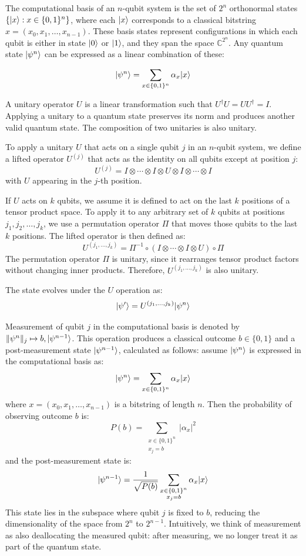 The computational basis of an $n$-qubit system is the set of $2^n$ orthonormal states $\{|x\rangle : x \in \{0,1\}^n\}$, where each $|x\rangle$ corresponds to a classical bitstring $x = (x_0, x_1, \ldots, x_{n-1})$. These basis states represent configurations in which each qubit is either in state $|0\rangle$ or $|1\rangle$, and they span the space $\mathbb{C}^{2^n}$. Any quantum state $|\psi^n\rangle$ can be expressed as a linear combination of these:

\[
|\psi^n\rangle = \sum_{x \in \{0,1\}^n} \alpha_x |x\rangle
\]


A unitary operator $U$ is a linear transformation such that $U^\dagger U = UU^\dagger = I$. Applying a unitary to a quantum state preserves its norm and produces another valid quantum state. The composition of two unitaries is also unitary.

To apply a unitary $U$ that acts on a single qubit $j$ in an $n$-qubit system, we define a lifted operator $U^{(j)}$ that acts as the identity on all qubits except at position $j$:
\[
U^{(j)} = I \otimes \cdots \otimes I \otimes U \otimes I \otimes \cdots \otimes I
\]
with $U$ appearing in the $j$-th position.

If $U$ acts on $k$ qubits, we assume it is defined to act on the last $k$ positions of a tensor product space. To apply it to any arbitrary set of $k$ qubits at positions $j_1, j_2, \ldots, j_k$, we use a permutation operator $\Pi$ that moves those qubits to the last $k$ positions. The lifted operator is then defined as:
\[
U^{(j_1, \ldots, j_k)} = \Pi^{-1} \circ (I \otimes \cdots \otimes I \otimes U) \circ \Pi
\]
The permutation operator $\Pi$ is unitary, since it rearranges tensor product factors without changing inner products. Therefore, $U^{(j_1, \ldots, j_k)}$ is also unitary.

The state evolves under the $U$ operation as:
\[
|\psi'\rangle = U^{(j_1, \ldots, j_k)} |\psi^n\rangle
\]


Measurement of qubit $j$ in the computational basis is denoted by $\|\psi^n\|_j \mapsto b, |\psi^{n-1}\rangle$. This operation produces a classical outcome $b \in \{0, 1\}$ and a post-measurement state $|\psi^{n-1}\rangle$, calculated as follows: assume $|\psi^n\rangle$ is expressed in the computational basis as:
\[
|\psi^n\rangle = \sum_{x \in \{0,1\}^n} \alpha_x |x\rangle
\]
where $x = (x_0, x_1, \ldots, x_{n-1})$ is a bitstring of length $n$. Then the probability of observing outcome $b$ is:
\[
P(b) = \sum_{\substack{x \in \{0,1\}^n \\ x_j = b}} |\alpha_x|^2
\]
and the post-measurement state is:
\[
|\psi^{n-1}\rangle = \frac{1}{\sqrt{P(b)}} \sum_{\substack{x \in \{0,1\}^n \\ x_j = b}} \alpha_x |x\rangle
\]
This state lies in the subspace where qubit $j$ is fixed to $b$, reducing the dimensionality of the space from $2^n$ to $2^{n-1}$. Intuitively, we think of measurement as also deallocating the measured qubit: after measuring, we no longer treat it as part of the quantum state.

